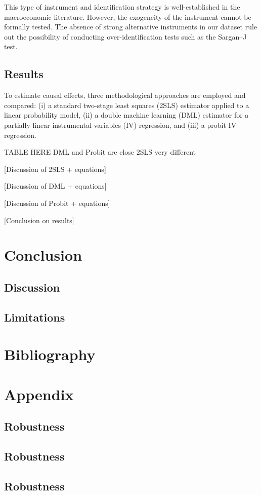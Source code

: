\documentclass[
  12pt,
]{article}
\begin{document}
This type of instrument and identification strategy is well-established
in the macroeconomic literature. However, the exogeneity of the
instrument cannot be formally tested. The absence of strong alternative
instruments in our dataset rule out the possibility of conducting
over-identification tests such as the Sargan--J test.

\subsection{Results}\label{results-2}

To estimate causal effects, three methodological approaches are employed
and compared: (i) a standard two-stage least squares (2SLS) estimator
applied to a linear probability model, (ii) a double machine learning
(DML) estimator for a partially linear instrumental variables (IV)
regression, and (iii) a probit IV regression.

\newpage

TABLE HERE DML and Probit are close 2SLS very different

{[}Discussion of 2SLS + equations{]}

{[}Discussion of DML + equations{]}

{[}Discussion of Probit + equations{]}

{[}Conclusion on results{]}

\newpage

\section{Conclusion}\label{conclusion}

\subsection{Discussion}\label{discussion}

\subsection{Limitations}\label{limitations}

\newpage

\section{Bibliography}\label{bibliography}

\newpage

\setcounter{section}{0}
\renewcommand\thesection{\Alph{section}}

\section{Appendix}\label{appendix}

\subsection{Robustness}\label{robustness}

\subsection{Robustness}\label{robustness-1}

\subsection{Robustness}\label{robustness-2}
\end{document}
